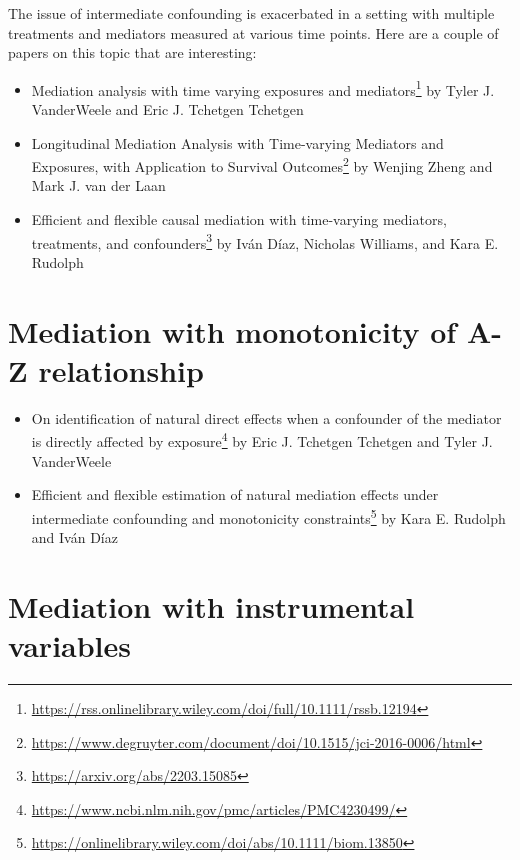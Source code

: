 \documentclass[
  12pt,
]{book}
\providecommand{\tightlist}{%
  \setlength{\itemsep}{0pt}\setlength{\parskip}{0pt}}
\renewcommand{\href}[2]{#2\footnote{\url{#1}}}
\theoremstyle{definition}
\theoremstyle{definition}
\theoremstyle{definition}
\newcommand{\1}{\mathbbm{1}}
\begin{document}
The issue of intermediate confounding is exacerbated in a setting with multiple
treatments and mediators measured at various time points. Here are a couple of
papers on this topic that are interesting:

\begin{itemize}
\tightlist
\item
  \href{https://rss.onlinelibrary.wiley.com/doi/full/10.1111/rssb.12194}{Mediation analysis with time varying exposures and
  mediators}
  by Tyler J. VanderWeele and Eric J. Tchetgen Tchetgen
\item
  \href{https://www.degruyter.com/document/doi/10.1515/jci-2016-0006/html}{Longitudinal Mediation Analysis with Time-varying Mediators and
  Exposures, with Application to Survival
  Outcomes}
  by Wenjing Zheng and Mark J. van der Laan
\item
  \href{https://arxiv.org/abs/2203.15085}{Efficient and flexible causal mediation with time-varying
  mediators, treatments, and
  confounders} by Iván Díaz,
  Nicholas Williams, and Kara E. Rudolph
\end{itemize}

\hypertarget{mediation-with-monotonicity-of-a-z-relationship}{%
\section{Mediation with monotonicity of A-Z relationship}\label{mediation-with-monotonicity-of-a-z-relationship}}

\begin{itemize}
\tightlist
\item
  \href{https://www.ncbi.nlm.nih.gov/pmc/articles/PMC4230499/}{On identification of natural direct effects when a confounder of the mediator
  is directly affected by
  exposure} by Eric J.
  Tchetgen Tchetgen and Tyler J. VanderWeele
\item
  \href{https://onlinelibrary.wiley.com/doi/abs/10.1111/biom.13850}{Efficient and flexible estimation of natural mediation effects under
  intermediate confounding and monotonicity
  constraints} by Kara E. Rudolph and Iván
  Díaz
\end{itemize}

\hypertarget{mediation-with-instrumental-variables}{%
\section{Mediation with instrumental variables}\label{mediation-with-instrumental-variables}}
\end{document}
